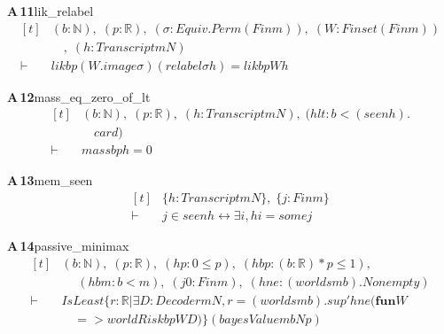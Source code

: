 \documentclass[conference]{IEEEtran}
\theoremstyle{definition}
\newcommand{\lean}[1]{\textsf{\footnotesize #1}}
\begin{document}
\noindent\textbf{A\,11}\quad\lean{lik\_relabel}
{\footnotesize\[ \begin{aligned}[t]
&(\mathit{b} : \mathbb{N} ),\; (\mathit{p} : \mathbb{R} ),\; (\sigma : \mathit{Equiv}.\mathit{Perm} (\mathit{Fin} \mathit{m})),\; (\mathit{W} : \mathit{Finset} (\mathit{Fin} \mathit{m}))\\
&\quad ,\; (\mathit{h} : \mathit{Transcript} \mathit{m} \mathit{N})\\
\vdash\;&\mathit{lik} \mathit{b} \mathit{p} (\mathit{W}.\mathit{image} \sigma ) (\mathit{relabel} \sigma \mathit{h}) = \mathit{lik} \mathit{b} \mathit{p} \mathit{W} \mathit{h}
\end{aligned} \]}

\noindent\textbf{A\,12}\quad\lean{mass\_eq\_zero\_of\_lt}
{\footnotesize\[ \begin{aligned}[t]
&(\mathit{b} : \mathbb{N} ),\; (\mathit{p} : \mathbb{R} ),\; (\mathit{h} : \mathit{Transcript} \mathit{m} \mathit{N}),\; (\mathit{hlt} : \mathit{b} < (\mathit{seen} \mathit{h}).\\
&\quad \mathit{card})\\
\vdash\;&\mathit{mass} \mathit{b} \mathit{p} \mathit{h} = 0
\end{aligned} \]}

\noindent\textbf{A\,13}\quad\lean{mem\_seen}
{\footnotesize\[ \begin{aligned}[t]
&\{ \mathit{h} : \mathit{Transcript} \mathit{m} \mathit{N}\},\; \{ \mathit{j} : \mathit{Fin} \mathit{m}\}\\
\vdash\;&\mathit{j} \in \mathit{seen} \mathit{h} \leftrightarrow \exists \mathit{i}, \mathit{h} \mathit{i} = \mathit{some} \mathit{j}
\end{aligned} \]}

\noindent\textbf{A\,14}\quad\lean{passive\_minimax}
{\footnotesize\[ \begin{aligned}[t]
&(\mathit{b} : \mathbb{N} ),\; (\mathit{p} : \mathbb{R} ),\; (\mathit{hp} : 0 \leq \mathit{p}),\; (\mathit{hbp} : (\mathit{b} : \mathbb{R} ) * \mathit{p} \leq 1),\\
&\quad \; (\mathit{hbm} : \mathit{b} < \mathit{m}),\; (\mathit{j0} : \mathit{Fin} \mathit{m}),\; (\mathit{hne} : (\mathit{worlds} \mathit{m} \mathit{b}).\mathit{Nonempty})\\
\vdash\;&\mathit{IsLeast} \{ \mathit{r} : \mathbb{R} | \exists \mathit{D} : \mathit{Decoder} \mathit{m} \mathit{N}, \mathit{r} = (\mathit{worlds} \mathit{m} \mathit{b}).\mathit{sup'} \mathit{hne} (\mathbf{fun} \mathit{W}\\
&\quad => \mathit{worldRisk} \mathit{b} \mathit{p} \mathit{W} \mathit{D})\} (\mathit{bayesValue} \mathit{m} \mathit{b} \mathit{N} \mathit{p})
\end{aligned} \]}
\end{document}
